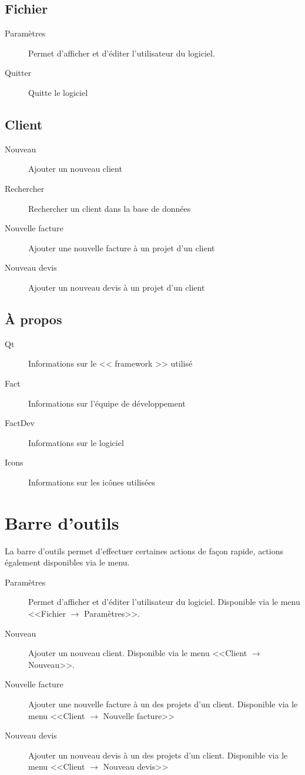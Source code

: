 \subsection{Fichier}
	\begin{description}
		\item[Paramètres] Permet d'afficher et d’éditer l’utilisateur du logiciel.
		\item[Quitter] Quitte le logiciel
	\end{description}
\subsection{Client}
\begin{description}
	\item[Nouveau] Ajouter un nouveau client
	\item[Rechercher] Rechercher un client dans la base de données
	\item[Nouvelle facture]  Ajouter une nouvelle facture à un projet d’un client
	\item[Nouveau devis] Ajouter un nouveau devis à un projet d’un client
\end{description}
\subsection{À propos}
\begin{description}
	\item[Qt] Informations sur le << framework >> utilisé
	\item[Fact] Informations sur l'équipe de développement
	\item[FactDev]Informations sur le logiciel
	\item[Icons] Informations sur les icônes utilisées
\end{description}
\section{Barre d'outils}
La barre d’outils permet d’effectuer certaines actions de façon rapide, actions également disponibles via le menu.

\begin{description}
	\item[Paramètres] Permet d'afficher et d’éditer l'utilisateur du logiciel. Disponible via le menu <<Fichier $\rightarrow$ Paramètres>>.
	\item[Nouveau] Ajouter un nouveau client. Disponible via le menu <<Client $\rightarrow$ Nouveau>>.
	\item[Nouvelle facture]  Ajouter une nouvelle facture à un des projets d’un client. Disponible via le menu <<Client $\rightarrow$ Nouvelle facture>>
	\item[Nouveau devis] Ajouter un nouveau devis à un des projets d’un client. Disponible via le menu <<Client $\rightarrow$ Nouveau devis>>
\end{description}

